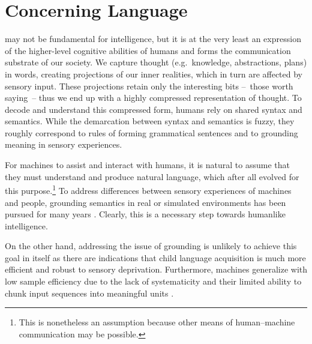 \documentclass[12pt,a4paper,oneside]{book}
\begin{document}
\setcounter{tocdepth}{2}
\tableofcontents
\listoffigures
\listoftables

\chapter{Concerning Language}
\label{sec:concerning-language}


may not be fundamental for intelligence, but it is at the very least an expression of the higher-level cognitive abilities of humans and forms the communication substrate of our society.
We capture thought (e.g.\ knowledge, abstractions, plans) in words, creating projections of our inner realities, which in turn are affected by sensory input.
These projections retain only the interesting bits --~those worth saying~-- thus we end up with a highly compressed representation of thought.
To decode and understand this compressed form, humans rely on shared syntax and semantics.
While the demarcation between syntax and semantics is fuzzy, they roughly correspond to rules of forming grammatical sentences and to grounding meaning in sensory experiences.

For machines to assist and interact with humans, it is natural to assume that they must understand and produce natural language, which after all evolved for this purpose.\footnote{This is nonetheless an assumption because other means of human--machine communication may be possible.}
To address differences between sensory experiences of machines and people, grounding semantics in real or simulated environments has been pursued for many years \citep{winograd1973understanding,hermann2017grounded}.
Clearly, this is a necessary step towards humanlike intelligence.

On the other hand, addressing the issue of grounding is unlikely to achieve this goal in itself as there are indications that child language acquisition is much more efficient \citep{cristia2017child, pullum2002empirical, shneidman2012language} and robust to sensory deprivation.
Furthermore, machines generalize with low sample efficiency \citep{hoffmann2022training, wei2022emergent, belinkov2017synthetic, jia2017adversarial, iyyer2018adversarial, moosavi2017lexical, agrawal2016analyzing} due to the lack of systematicity \citep{dziri2023faith, kuncoro2018lstms} and their limited ability to chunk input sequences into meaningful units \citep{cao-rimell-2021-evaluate,bostrom-durrett-2020-byte,wang2017sequence}.
\end{document}
